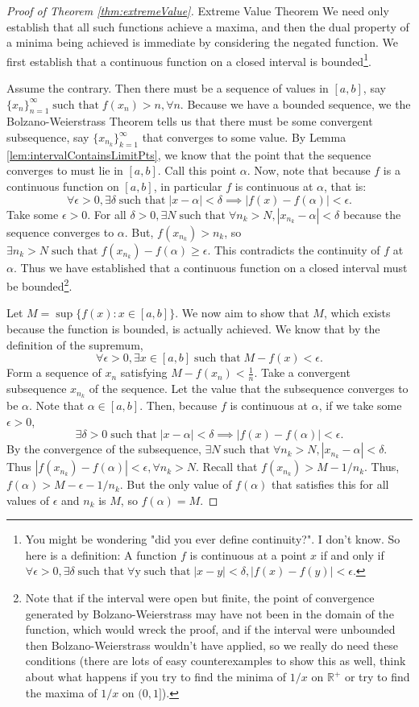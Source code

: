 \documentclass{article}[11pt]
\DeclareMathOperator{\st}{\text{ such that }}
\begin{document}
\begin{proof}[Proof of Theorem \ref{thm:extremeValue}]{Extreme Value Theorem}
	We need only establish that all such functions achieve a maxima, and then the dual property of a minima being achieved is immediate by considering the negated function.
We first establish that a continuous function on a closed interval is bounded\footnote{You might be wondering "did you ever define continuity?". I don't know. So here is a definition: A function $f$ is continuous at a point $x$ if and only if $\forall \epsilon > 0, \exists \delta \st \forall $y$ \st |x-y|<\delta, |f(x)-f(y)|<\epsilon$.}.

Assume the contrary. 
Then there must be a sequence of values in $[a,b]$, say $\{x_n\}_{n=1}^\infty \st f(x_n) > n, \forall n$.
Because we have a bounded sequence, we the Bolzano-Weierstrass Theorem tells us that there must be some convergent subsequence, say $\{x_{n_k}\}_{k=1}^\infty$ that converges to some value. 
By Lemma \ref{lem:intervalContainsLimitPts}, we know that the point that the sequence converges to must lie in $[a,b]$. Call this point $\alpha$.
Now, note that because $f$ is a continuous function on $[a,b]$, in particular $f$ is continuous at $\alpha$, that is:
$$\forall \epsilon > 0, \exists \delta \st |x-\alpha| < \delta \implies |f(x)-f(\alpha)| < \epsilon.$$
Take some $\epsilon > 0$. For all $\delta > 0, \exists N \st \forall n_k > N, |x_{n_k} - \alpha| < \delta$ because the sequence converges to $\alpha$.
But, $f(x_{n_k}) > n_k$, so $\exists n_k > N \st f(x_{n_k}) - f(\alpha) \ge \epsilon$.
This contradicts the continuity of $f$ at $\alpha$.
Thus we have established that a continuous function on a closed interval must be bounded\footnote{Note that if the interval were open but finite, the point of convergence generated by Bolzano-Weierstrass may have not been in the domain of the function, which would wreck the proof, and if the interval were unbounded then Bolzano-Weierstrass wouldn't have applied, so we really do need these conditions (there are lots of easy counterexamples to show this as well, think about what happens if you try to find the minima of $1/x$ on $\mathbb{R}^+$ or try to find the maxima of $1/x$ on $(0,1]$).}.

Let $M = \sup{\{f(x) : x \in [a, b]\}}$. We now aim to show that $M$, which exists because the function is bounded, is actually achieved. 
We know that by the definition of the supremum, 
$$\forall \epsilon > 0, \exists x\in [a,b] \st M-f(x) < \epsilon.$$
Form a sequence of $x_n$ satisfying $M-f(x_n) < \frac{1}{n}$.
Take a convergent subsequence $x_{n_k}$ of the sequence. 
Let the value that the subsequence converges to be $\alpha$. 
Note that $\alpha \in [a, b]$.
Then, because $f$ is continuous at $\alpha$, if we take some $\epsilon > 0$, 
$$ \exists \delta > 0 \st |x-\alpha| < \delta \implies |f(x) - f(\alpha)| < \epsilon.$$
By the convergence of the subsequence, $\exists N \st \forall n_k > N, |x_{n_k}  - \alpha| < \delta.$
Thus $|f(x_{n_k}) - f(\alpha)| < \epsilon, \forall n_k > N$.
Recall that $f(x_{n_k}) > M - 1/n_k$.
Thus, 
$f(\alpha) > M - \epsilon - 1/n_k$.
But the only value of $f(\alpha)$ that satisfies this for all values of $\epsilon$ and $n_k$ is $M$, so $f(\alpha) = M$.


\end{proof}
\end{document}
